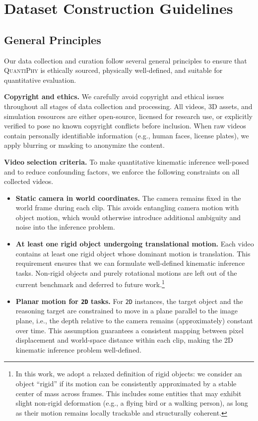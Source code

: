 \section{Dataset Construction Guidelines} \label{appendix:data_collection}

\subsection{General Principles}
\label{sec:general_principles}
Our data collection and curation follow several general principles to ensure that \textsc{QuantiPhy} is ethically sourced, physically well-defined, and suitable for quantitative evaluation.

\noindent\textbf{Copyright and ethics.}
We carefully avoid copyright and ethical issues throughout all stages of data collection and processing.
All videos, 3D assets, and simulation resources are either open-source, licensed for research use, or explicitly verified to pose no known copyright conflicts before inclusion.
When raw videos contain personally identifiable information (e.g., human faces, license plates), we apply blurring or masking to anonymize the content.

\noindent\textbf{Video selection criteria.}
To make quantitative kinematic inference well-posed and to reduce confounding factors, we enforce the following constraints on all collected videos.
\begin{itemize}[leftmargin=*]
  \item \textbf{Static camera in world coordinates.}
  The camera remains fixed in the world frame during each clip.
  This avoids entangling camera motion with object motion, which would otherwise introduce additional ambiguity and noise into the inference problem.
    \item \textbf{At least one rigid object undergoing translational motion.}
    Each video contains at least one rigid object whose dominant motion is translation.
    This requirement ensures that we can formulate well-defined kinematic inference tasks.
    Non-rigid objects and purely rotational motions are left out of the current benchmark and deferred to future work.\footnote{In this work, we adopt a relaxed definition of rigid objects: we consider an object ``rigid'' if its motion can be consistently approximated by a stable center of mass across frames. This includes some entities that may exhibit slight non-rigid deformation (e.g., a flying bird or a walking person), as long as their motion remains locally trackable and structurally coherent.}
  \item \textbf{Planar motion for \texttt{2D} tasks.}
  For \texttt{2D} instances, the target object and the reasoning target are constrained to move in a plane parallel to the image plane, i.e., the depth relative to the camera remains (approximately) constant over time.
  This assumption guarantees a consistent mapping between pixel displacement and world-space distance within each clip, making the 2D kinematic inference problem well-defined.
\end{itemize}

